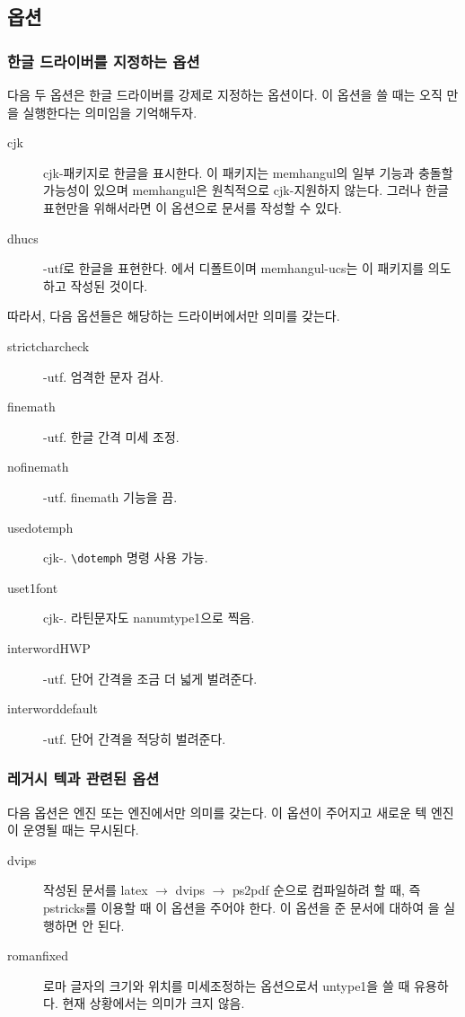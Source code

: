 \documentclass[
	12pt,
	a4paper,
	kosection,
	footnote,
	nobookmarks,
	microtype,
]{oblivoir}
\newcommand\obclass{ob\-liv\-oir\oblivoirallowbreak}
\begin{document}
\subsection{ 옵션}

\subsubsection{한글 드라이버를 지정하는 옵션}

다음 두 옵션은 한글 드라이버를 강제로 지정하는 옵션이다. 이 옵션을 쓸 때는 오직 만을 
실행한다는 의미임을 기억해두자.
\begin{description}
\item [cjk] cjk-\ko 패키지로 한글을 표시한다. 이 패키지는 memhangul의 일부 기능과 충돌할 가능성이
있으며 memhangul은 원칙적으로 cjk- 지원하지 않는다. 그러나 한글 표현만을 위해서라면 이 옵션으로
문서를 작성할 수 있다.
\item [dhucs] \koTeX-utf로 한글을 표현한다. 에서 디폴트이며 memhangul-ucs는
이 패키지를 의도하고 작성된 것이다.
\end{description}

따라서, 다음 옵션들은 해당하는 드라이버에서만 의미를 갖는다.
\begin{description}
\item [strictcharcheck] \koTeX-utf. 엄격한 문자 검사.
\item [finemath] \koTeX-utf. 한글 간격 미세 조정.
\item [nofinemath] \koTeX-utf. finemath 기능을 끔.
\item [usedotemph] cjk-\ko. \verb|\dotemph| 명령 사용 가능.
\item [uset1font] cjk-\ko. 라틴문자도 nanumtype1으로 찍음.
\item [interwordHWP] \koTeX-utf. 단어 간격을 조금 더 넓게 벌려준다.
\item [interworddefault] \koTeX-utf. 단어 간격을 적당히 벌려준다.
\end{description}

\subsubsection{레거시 텍과 관련된 옵션}

다음 옵션은  엔진 또는  엔진에서만 의미를 갖는다. 이 옵션이 주어지고
새로운 텍 엔진이 운영될 때는 무시된다.
\begin{description}
\item [dvips]  작성된 문서를 latex $\rightarrow$ dvips $\rightarrow$ ps2pdf 순으로
컴파일하려 할 때, 즉 pstricks를 이용할 때 이 옵션을 주어야 한다. 이 옵션을 준 문서에 대하여 을 
실행하면 안 된다.
\item [romanfixed] 로마 글자의 크기와 위치를 미세조정하는 옵션으로서 untype1을 쓸 때 유용하다. 현재 상황에서는 의미가 크지 않음.
\end{description}
\end{document}
